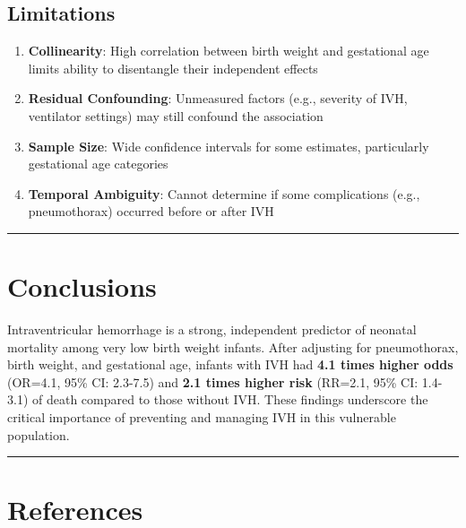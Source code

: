 \documentclass[
]{article}
\providecommand{\tightlist}{%
  \setlength{\itemsep}{0pt}\setlength{\parskip}{0pt}}
\begin{document}
\hypertarget{limitations}{%
\subsection{Limitations}\label{limitations}}

\begin{enumerate}
\def\labelenumi{\arabic{enumi}.}
\tightlist
\item
  \textbf{Collinearity}: High correlation between birth weight and
  gestational age limits ability to disentangle their independent
  effects
\item
  \textbf{Residual Confounding}: Unmeasured factors (e.g., severity of
  IVH, ventilator settings) may still confound the association
\item
  \textbf{Sample Size}: Wide confidence intervals for some estimates,
  particularly gestational age categories
\item
  \textbf{Temporal Ambiguity}: Cannot determine if some complications
  (e.g., pneumothorax) occurred before or after IVH
\end{enumerate}

\begin{center}\rule{0.5\linewidth}{0.5pt}\end{center}

\hypertarget{conclusions}{%
\section{Conclusions}\label{conclusions}}

Intraventricular hemorrhage is a strong, independent predictor of
neonatal mortality among very low birth weight infants. After adjusting
for pneumothorax, birth weight, and gestational age, infants with IVH
had \textbf{4.1 times higher odds} (OR=4.1, 95\% CI: 2.3-7.5) and
\textbf{2.1 times higher risk} (RR=2.1, 95\% CI: 1.4-3.1) of death
compared to those without IVH. These findings underscore the critical
importance of preventing and managing IVH in this vulnerable population.

\begin{center}\rule{0.5\linewidth}{0.5pt}\end{center}

\hypertarget{references}{%
\section{References}\label{references}}
\end{document}
